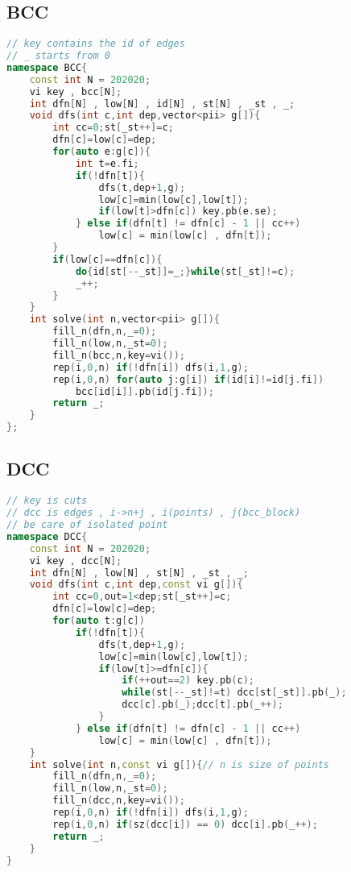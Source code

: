 \subsection{BCC}
\begin{lstlisting}[language=C++]
// key contains the id of edges
// _ starts from 0
namespace BCC{
    const int N = 202020;
    vi key , bcc[N];
    int dfn[N] , low[N] , id[N] , st[N] , _st , _;
    void dfs(int c,int dep,vector<pii> g[]){
        int cc=0;st[_st++]=c;
        dfn[c]=low[c]=dep;
        for(auto e:g[c]){
            int t=e.fi;
            if(!dfn[t]){
                dfs(t,dep+1,g);
                low[c]=min(low[c],low[t]);
                if(low[t]>dfn[c]) key.pb(e.se);
            } else if(dfn[t] != dfn[c] - 1 || cc++)
                low[c] = min(low[c] , dfn[t]);
        }
        if(low[c]==dfn[c]){
            do{id[st[--_st]]=_;}while(st[_st]!=c);
            _++;
        }
    }
    int solve(int n,vector<pii> g[]){
        fill_n(dfn,n,_=0);
        fill_n(low,n,_st=0);
        fill_n(bcc,n,key=vi());
        rep(i,0,n) if(!dfn[i]) dfs(i,1,g);
        rep(i,0,n) for(auto j:g[i]) if(id[i]!=id[j.fi])
            bcc[id[i]].pb(id[j.fi]);
        return _;
    }
};
\end{lstlisting}
\subsection{DCC}
\begin{lstlisting}[language=C++]
// key is cuts
// dcc is edges , i->n+j , i(points) , j(bcc_block)
// be care of isolated point
namespace DCC{
    const int N = 202020;
    vi key , dcc[N];
    int dfn[N] , low[N] , st[N] , _st , _;
    void dfs(int c,int dep,const vi g[]){
        int cc=0,out=1<dep;st[_st++]=c;
        dfn[c]=low[c]=dep;
        for(auto t:g[c])
            if(!dfn[t]){
                dfs(t,dep+1,g);
                low[c]=min(low[c],low[t]);
                if(low[t]>=dfn[c]){
                    if(++out==2) key.pb(c);
                    while(st[--_st]!=t) dcc[st[_st]].pb(_);
                    dcc[c].pb(_);dcc[t].pb(_++);
                }
            } else if(dfn[t] != dfn[c] - 1 || cc++)
                low[c] = min(low[c] , dfn[t]);
    }
    int solve(int n,const vi g[]){// n is size of points
        fill_n(dfn,n,_=0);
        fill_n(low,n,_st=0);
        fill_n(dcc,n,key=vi());
        rep(i,0,n) if(!dfn[i]) dfs(i,1,g);
        rep(i,0,n) if(sz(dcc[i]) == 0) dcc[i].pb(_++);
        return _;
    }
}
\end{lstlisting}
